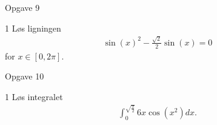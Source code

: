 %
%
%
%
%
\begin{opgavetekst}{Opgave 9}
\end{opgavetekst}
\begin{delopgave}{1}
	Løs ligningen 
	\begin{align*}
		\sin(x)^2 - \frac{\sqrt{2}}{2}\sin(x) = 0
	\end{align*}
	for $x \in [0, 2\pi]$. 
\end{delopgave}
%
%
%
%
%
%
\begin{opgavetekst}{Opgave 10}
\end{opgavetekst}
\begin{delopgave}{1}
	Løs integralet
	\begin{align*}
		\int_0^{\sqrt{\frac{\pi}{2}}} 6x\cos(x^2) dx.
	\end{align*}
\end{delopgave}
